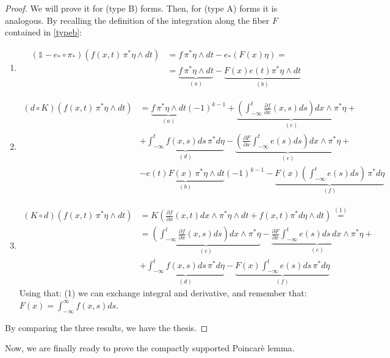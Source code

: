 \documentclass[a4paper,11pt,titlepage, article, oneside]{memoir}
\numberwithin{equation}{section}
\theoremstyle{definition}
\theoremstyle{remark}
\newcommand{\defonde}[2]{\frac{\partial {#1}}{\partial {#2}}}
\begin{document}
\begin{proof}
We will prove it for (type B) forms. Then, for (type A) forms it is analogous. By recalling the definition of the integration along the fiber $F$ contained in \eqref{typeb}:
\begin{enumerate}
\item
\begin{align*}
(\mathbb{1} - e_* \circ \pi_*)(f(x, t) \, \pi^* \eta \wedge dt ) &=f\, \pi^*\eta \wedge dt - e_*(F(x) \eta) = \\
&= \underbrace{f\, \pi^* \eta \wedge dt}_{(a)} - \underbrace{F(x) e(t) \pi^* \eta \wedge dt}_{(b)}
\end{align*}
\item
\begin{align*}
(d \circ K)(f(x, t) \, \pi^* \eta \wedge dt) &= \underbrace{f\, \pi^* \eta \wedge dt}_{(a)}(-1)^{k-1} + \underbrace{\left( \int_{-\infty}^t \defonde{f}{x}(x, s) ds \right) dx \wedge \pi^* \eta}_{(c)} + \\
&+ \underbrace{\int_{-\infty}^t f(x, s) ds \, \pi^* d\eta}_{(d)} - \underbrace{\left( \defonde{F}{x}\int_{-\infty}^t e(s) ds \right) dx \wedge \pi^* \eta}_{(e)} + \\
&- \underbrace{e(t)F(x) \, \pi^*\eta \wedge dt}_{(b)} (-1)^{k-1} - \underbrace{F(x)\left(\int_{-\infty}^t e(s) ds \right)\, \pi^* d\eta}_{(f)}
\end{align*}
\item
\begin{align*}
(K \circ d) (f(x, t) \, \pi^* \eta \wedge dt) &= K \left( \defonde{f}{x}(x, t) dx \wedge \pi^*\eta \wedge dt + f(x, t) \pi^* d\eta \wedge dt\right) \overset{(1)}{=} \\
&= \underbrace{\left(\int_{-\infty}^t \defonde{f}{x}(x, s) ds \right) dx \wedge \pi^*\eta}_{(c)} - \underbrace{\defonde{F}{x} \int_{-\infty}^t e(s)ds \,dx \wedge \pi^* \eta}_{(e)} + \\
&+ \underbrace{\int_{-\infty}^t f(x, s) ds \, \pi^* d\eta}_{(d)} - \underbrace{F(x) \int_{-\infty}^t e(s) ds \, \pi^* d\eta}_{(f)}
\end{align*}
Using that: (1) we can exchange integral and derivative, and remember that: $F(x) = \int_{-\infty}^{\infty} f(x, s) ds$.
\end{enumerate}
By comparing the three results, we have the thesis.
\end{proof}

Now, we are finally ready to prove the compactly supported Poincarè lemma.
\end{document}
